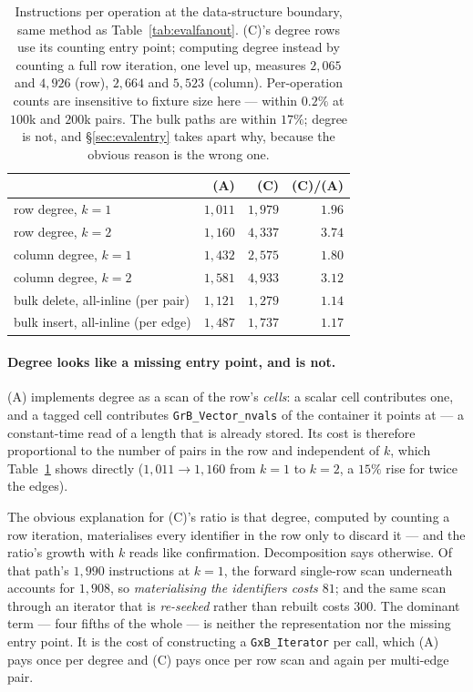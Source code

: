 \documentclass[11pt,a4paper]{article}
\theoremstyle{plain}
\theoremstyle{definition}
\theoremstyle{remark}
\begin{document}
\begin{table}[!ht]
\centering
\small
\begin{tabular}{@{}lrrr@{}}
\toprule
 & (A) & (C) & (C)/(A) \\
\midrule
row degree, $k=1$              & $1{,}011$ & $1{,}979$ & $1.96$ \\
row degree, $k=2$              & $1{,}160$ & $4{,}337$ & $3.74$ \\
column degree, $k=1$           & $1{,}432$ & $2{,}575$ & $1.80$ \\
column degree, $k=2$           & $1{,}581$ & $4{,}933$ & $3.12$ \\
\addlinespace
bulk delete, all-inline (per pair) & $1{,}121$ & $1{,}279$ & $1.14$ \\
bulk insert, all-inline (per edge) & $1{,}487$ & $1{,}737$ & $1.17$ \\
\bottomrule
\end{tabular}
\caption{Instructions per operation at the data-structure boundary, same
method as Table~\ref{tab:evalfanout}. (C)'s degree rows use its counting entry
point; computing degree instead by counting a full row iteration, one level up,
measures $2{,}065$ and $4{,}926$ (row), $2{,}664$ and $5{,}523$ (column).
Per-operation counts are insensitive to fixture size here --- within $0.2\%$ at
$100$k and $200$k pairs. The bulk paths are within $17\%$; degree is not, and
\S\ref{sec:evalentry} takes apart why, because the obvious reason is the wrong
one.}
\label{tab:evalentry}
\end{table}

\paragraph{Degree looks like a missing entry point, and is not.} (A) implements
degree as a scan of the row's \emph{cells}: a scalar cell contributes one, and a
tagged cell contributes \texttt{GrB\_Vector\_nvals} of the container it points
at --- a constant-time read of a length that is already stored. Its cost is
therefore proportional to the number of pairs in the row and independent of
$k$, which Table~\ref{tab:evalentry} shows directly ($1{,}011 \to 1{,}160$ from
$k=1$ to $k=2$, a $15\%$ rise for twice the edges).

The obvious explanation for (C)'s ratio is that degree, computed by counting a
row iteration, materialises every identifier in the row only to discard it ---
and the ratio's growth with $k$ reads like confirmation. Decomposition says
otherwise. Of that path's $1{,}990$ instructions at $k=1$, the forward
single-row scan underneath accounts for $1{,}908$, so \emph{materialising the
identifiers costs $81$}; and the same scan through an iterator that is
\emph{re-seeked} rather than rebuilt costs $300$. The dominant term --- four
fifths of the whole --- is neither the representation nor the missing entry
point. It is the cost of constructing a \texttt{GxB\_Iterator} per call, which
(A) pays once per degree and (C) pays once per row scan and again per multi-edge
pair.
\end{document}
